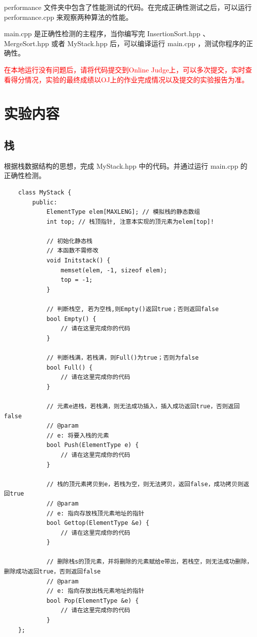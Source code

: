 \documentclass{article}
\begin{document}
performance 文件夹中包含了性能测试的代码。在完成正确性测试之后，可以运行 performance.cpp 来观察两种算法的性能。

main.cpp 是正确性检测的主程序，当你编写完 InsertionSort.hpp 、 MergeSort.hpp 或者 MyStack.hpp 后，可以编译运行 main.cpp ，测试你程序的正确性。

\textcolor{red}{在本地运行没有问题后，请将代码提交到Online Judge上，可以多次提交，实时查看得分情况，实验的最终成绩以OJ上的作业完成情况以及提交的实验报告为准。}

\section{实验内容}

\subsection{栈}

根据栈数据结构的思想，完成 MyStack.hpp 中的代码。并通过运行 main.cpp 的正确性检测。

\begin{lstlisting}
    class MyStack {
        public:
            ElementType elem[MAXLENG]; // 模拟栈的静态数组
            int top; // 栈顶指针, 注意本实现的顶元素为elem[top]!

            // 初始化静态栈
            // 本函数不需修改
            void Initstack() {
                memset(elem, -1, sizeof elem);
                top = -1;
            }

            // 判断栈空, 若为空栈,则Empty()返回true；否则返回false
            bool Empty() {
                // 请在这里完成你的代码
            }

            // 判断栈满，若栈满，则Full()为true；否则为false
            bool Full() {
                // 请在这里完成你的代码
            }

            // 元素e进栈，若栈满，则无法成功插入，插入成功返回true，否则返回false
            // @param
            // e: 将要入栈的元素
            bool Push(ElementType e) {
                // 请在这里完成你的代码
            }

            // 栈的顶元素拷贝到e，若栈为空，则无法拷贝，返回false，成功拷贝则返回true
            // @param
            // e: 指向存放栈顶元素地址的指针
            bool Gettop(ElementType &e) {
                // 请在这里完成你的代码
            }

            // 删除栈s的顶元素，并将删除的元素赋给e带出，若栈空，则无法成功删除，删除成功返回true，否则返回false
            // @param
            // e: 指向存放出栈元素地址的指针
            bool Pop(ElementType &e) {
                // 请在这里完成你的代码
            }
    };
\end{lstlisting}
\end{document}
